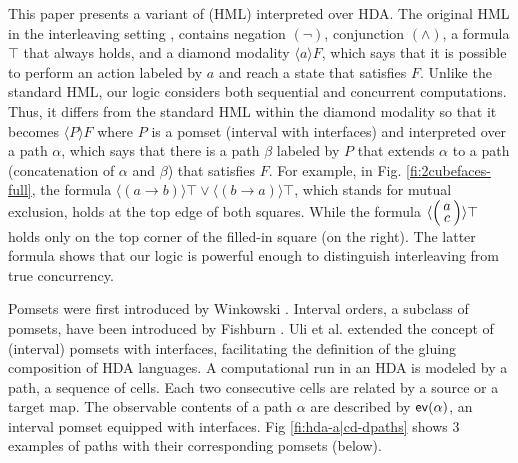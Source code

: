 \documentclass[11pt,a4paper,oldfontcommands]{memoir}
\makeatletter
\newcommand*\ev{\textup{\textsf{ev}}}
\newcommand\pomsetwop[4]{%
  \vcenter{\xymatrix@1@R=#1@C=#2@M=#3{#4}}%
}
\newcommand\pomset[2][1.3]{%
  \left(%
    \pomsetwop{0ex}{#1em}{2pt}{#2}%
  \right)%
}
\makeatother
\begin{document}
This paper presents a variant of (HML) interpreted over HDA. The original HML in the interleaving setting \cite{hennessy1985algebraic}, contains negation $(\neg )$, conjunction $(\wedge)$, a formula $\top$ that always holds, and a diamond modality $\langle a \rangle F$, which says that it is possible to perform an action labeled by $a$ and reach a state that satisfies $F$. Unlike the standard HML, our logic considers both sequential and concurrent computations. Thus, it differs from the standard HML within the diamond modality so that it becomes $\langle P \rangle F$ where $P$ is a pomset (interval with interfaces) and interpreted over a path $\alpha$, which says that there is a path $\beta$ labeled by $P$ that extends $\alpha$ to a path (concatenation of $\alpha$ and $\beta$) that satisfies $F$. For example, in Fig. \ref{fi:2cubefaces-full}, the formula $\langle (a \longrightarrow b) \rangle \top \vee \langle (b \longrightarrow a) \rangle \top$, which stands for mutual exclusion, holds at the top edge of both squares. While the formula $\langle \pomset{a \\ c} \rangle \top$ holds only on the top corner of the filled-in square (on the right). The latter formula shows that our logic is powerful enough to distinguish interleaving from true concurrency. 

Pomsets were first introduced by Winkowski \cite{winkowski1977algebraic}. Interval orders, a subclass of pomsets, have been introduced by Fishburn \cite{fishburn1970intransitive}. Uli et al. \cite{LanguageofHDA} extended the concept of (interval) pomsets with interfaces, facilitating the definition of the gluing composition of HDA languages.
 A computational run in an HDA is modeled by a path, a sequence of cells. Each two consecutive cells are related by a source or a target map. The observable contents of a path $\alpha$ are described by $\ev(\alpha)$, an interval pomset equipped with interfaces. Fig \ref{fi:hda-a|cd-dpaths} shows 3 examples of paths with their corresponding pomsets (below).




\end{document}

